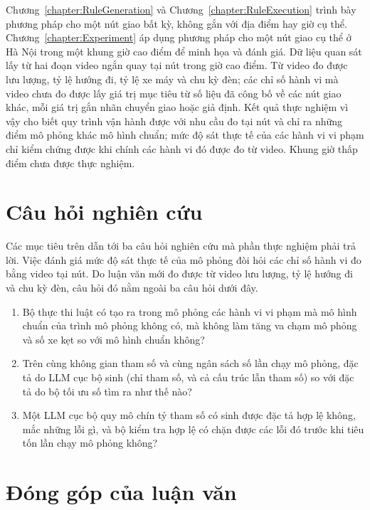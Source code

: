 \documentclass[../main.tex]{subfiles}
\begin{document}
Chương~\ref{chapter:RuleGeneration} và Chương~\ref{chapter:RuleExecution} trình bày phương pháp cho một nút giao bất kỳ, không gắn với địa điểm hay giờ cụ thể. Chương~\ref{chapter:Experiment} áp dụng phương pháp cho một nút giao cụ thể ở Hà Nội trong một khung giờ cao điểm để minh họa và đánh giá. Dữ liệu quan sát lấy từ hai đoạn video ngắn quay tại nút trong giờ cao điểm. Từ video đo được lưu lượng, tỷ lệ hướng đi, tỷ lệ xe máy và chu kỳ đèn; các chỉ số hành vi mà video chưa đo được lấy giá trị mục tiêu từ số liệu đã công bố về các nút giao khác, mỗi giá trị gắn nhãn chuyển giao hoặc giả định. Kết quả thực nghiệm vì vậy cho biết quy trình vận hành được với nhu cầu đo tại nút và chỉ ra những điểm mô phỏng khác mô hình chuẩn; mức độ sát thực tế của các hành vi vi phạm chỉ kiểm chứng được khi chính các hành vi đó được đo từ video. Khung giờ thấp điểm chưa được thực nghiệm.

\section{Câu hỏi nghiên cứu}
\label{section:rq}

Các mục tiêu trên dẫn tới ba câu hỏi nghiên cứu mà phần thực nghiệm phải trả lời. Việc đánh giá mức độ sát thực tế của mô phỏng đòi hỏi các chỉ số hành vi đo bằng video tại nút. Do luận văn mới đo được từ video lưu lượng, tỷ lệ hướng đi và chu kỳ đèn, câu hỏi đó nằm ngoài ba câu hỏi dưới đây.

\begin{enumerate}[label=\textbf{CH\arabic*.}, leftmargin=*]
    \item Bộ thực thi luật có tạo ra trong mô phỏng các hành vi vi phạm mà mô hình chuẩn của trình mô phỏng không có, mà không làm tăng va chạm mô phỏng và số xe kẹt so với mô hình chuẩn không?
    \item Trên cùng không gian tham số và cùng ngân sách số lần chạy mô phỏng, đặc tả do LLM cục bộ sinh (chỉ tham số, và cả cấu trúc lẫn tham số) so với đặc tả do bộ tối ưu số tìm ra như thế nào?
    \item Một LLM cục bộ quy mô chín tỷ tham số có sinh được đặc tả hợp lệ không, mắc những lỗi gì, và bộ kiểm tra hợp lệ có chặn được các lỗi đó trước khi tiêu tốn lần chạy mô phỏng không?
\end{enumerate}

\section{Đóng góp của luận văn}
\label{section:1.contrib}
\end{document}

